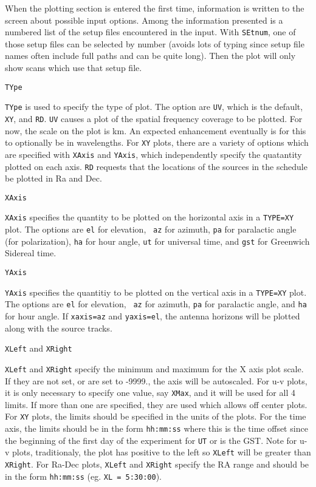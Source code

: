 \documentclass{report}
\begin{document}
When the plotting section is entered the first time, information is written
to the screen about possible input options.  Among the information presented
is a numbered list of the setup files encountered in the input.  With
{\tt SEtnum}, one of those setup files can be selected by number (avoids
lots of typing since setup file names often include full paths and can
be quite long).  Then the plot will only show scans which use that setup
file.

{\tt TYpe}

{\tt TYpe} is used to specify the type of plot.  The option are {\tt UV},
which is the default, {\tt XY}, and {\tt RD}.  {\tt UV} causes a plot of the
spatial frequency coverage to be plotted.  For now, the scale on the
plot is km.  An expected enhancement eventually is for this to optionally
be in wavelengths.  For {\tt XY} plots, there are a variety of options
which are specified with {\tt XAxis} and {\tt YAxis}, which independently
specify the quatantity plotted on each axis.  {\tt RD} requests that the
locations of the sources in the schedule be plotted in Ra and Dec.

{\tt XAxis}

{\tt XAxis} specifies the quantity to be plotted on the horizontal axis
in a {\tt TYPE=XY} plot.  The options are {\tt el} for elevation, {\tt
az} for azimuth, {\tt pa} for paralactic angle (for polarization),
{\tt ha} for hour angle, {\tt ut} for universal time, and {\tt gst} for
Greenwich Sidereal time.

{\tt YAxis}

{\tt YAxis} specifies the quantitiy to be plotted on the vertical axis
in a {\tt TYPE=XY} plot. The options are {\tt el} for elevation, {\tt
az} for azimuth, {\tt pa} for paralactic angle, and {\tt ha} for hour
angle.  If {\tt xaxis=az} and {\tt yaxis=el}, the antenna horizons
will be plotted along with the source tracks.

{\tt XLeft} and {\tt XRight}

{\tt XLeft} and {\tt XRight} specify the minimum and maximum for the
X axis plot scale.  If they are not set, or are set to -9999., the axis will
be autoscaled.  For u-v plots, it is only necessary to specify one
value, say {\tt XMax}, and it will be used for all 4 limits.  If more
than one are specified, they are used which allows off center plots.
For {\tt XY} plots, the limits should be specified in the units of
the plots.  For the time axis, the limits should be in the form
{\tt hh:mm:ss} where this is the time offset since the beginning of the
first day of the experiment for {\tt UT} or is the GST.  Note for u-v
plots, traditionaly, the plot has positive to the left so {\tt XLeft} will
be greater than {\tt XRight}.  For Ra-Dec plots, {\tt XLeft} and {\tt XRight}
specify the RA range and should be in the form {\tt hh:mm:ss} (eg.
{\tt XL = 5:30:00}).
\end{document}
